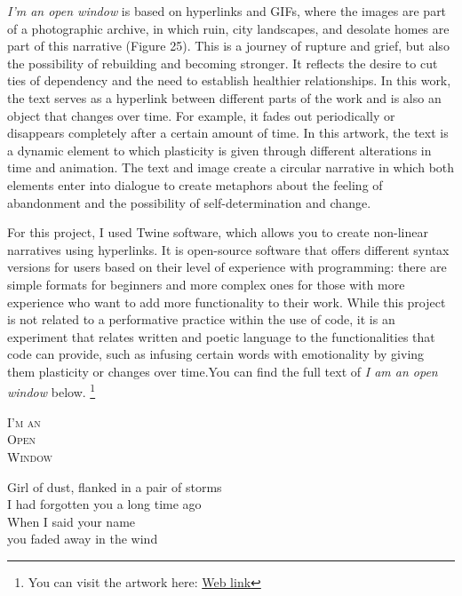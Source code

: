 \documentclass[12pt, twoside, a4paper]{report}
\begin{document}
\textit{I’m an open window} is based on hyperlinks and GIFs, where the images are part of a photographic archive, in which ruin, city landscapes, and desolate homes are part of this narrative (Figure 25).
This is a journey of rupture and grief, but also the possibility of
rebuilding and becoming stronger. It reflects the desire to cut ties of dependency and the need to establish healthier relationships. In this work, the text serves as a hyperlink between different parts of the work and is also an object that changes over time. For example, it fades out periodically or disappears completely after a certain amount of time.  In this artwork, the text is a dynamic element to which plasticity is given through different alterations in time and animation.  The text and image create a circular narrative in which both elements enter into dialogue to create metaphors about the feeling of abandonment and the possibility of self-determination and change.

 For this project, I used Twine software, which allows you to create non-linear narratives using hyperlinks. It is open-source software that offers different syntax versions for users based on their level of experience with programming: there are simple formats for beginners and more complex ones for those with more experience who want to add more functionality to their work. While this project is not related to a performative practice within the use of code, it is an experiment that relates written and poetic language to the functionalities that code can provide, such as infusing certain words with emotionality by giving them plasticity or changes over time.You can find the full text of \textit{I am an open window} below. \footnote{You can visit the artwork here: \href{https://sulesu.itch.io/im-an-open-window}{Web link}}

\begin{center}
\textsc{I'm an\\
Open\\
Window}
\end{center}

\vspace{0.5em}

\begin{center}
Girl of dust, flanked in a pair of storms\\
I had forgotten you a long time ago\\
When I said your name\\
you faded away in the wind
\end{center}
\end{document}

